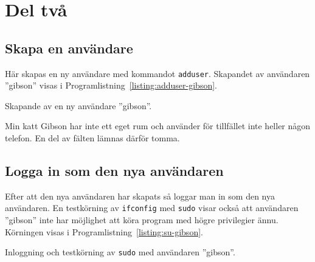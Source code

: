 %
%
%


\section{Del två}


\subsection{Skapa en användare}
Här skapas en ny användare med kommandot \texttt{adduser}.  Skapandet av
användaren ''gibson'' visas i Programlistning~\ref{listing:adduser-gibson}.

\begin{listing}[H]
\caption{Skapande av en ny användare ''gibson''.}
\label{listing:adduser-gibson}
\end{listing}

Min katt Gibson har inte ett eget rum och använder för tillfället inte heller
någon telefon. En del av fälten lämnas därför tomma.


\subsection{Logga in som den nya användaren}
Efter att den nya användaren har skapats så loggar man in som den nya
användaren.  En testkörning av \texttt{ifconfig} med \texttt{sudo} visar också
att användaren ''gibson'' inte har möjlighet att köra program med högre
privilegier ännu. Körningen visas i Programlistning~\ref{listing:su-gibson}.

\begin{listing}[H]
\caption{Inloggning och testkörning av \texttt{sudo} med användaren ''gibson''.}
\label{listing:su-gibson}
\end{listing}

